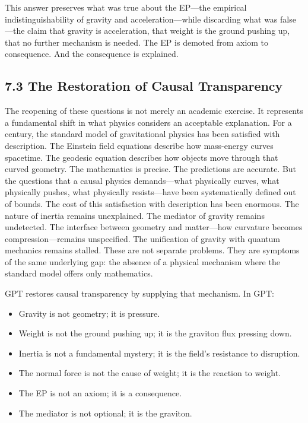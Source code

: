 \documentclass[11pt]{article}
\begin{document}
This answer preserves what was true about the EP---the empirical indistinguishability of gravity and acceleration---while discarding what was false---the claim that gravity is acceleration, that weight is the ground pushing up, that no further mechanism is needed. The EP is demoted from axiom to consequence. And the consequence is explained.

\subsection{7.3 The Restoration of Causal Transparency}

The reopening of these questions is not merely an academic exercise. It represents a fundamental shift in what physics considers an acceptable explanation. For a century, the standard model of gravitational physics has been satisfied with description. The Einstein field equations describe how mass-energy curves spacetime. The geodesic equation describes how objects move through that curved geometry. The mathematics is precise. The predictions are accurate. But the questions that a causal physics demands---what physically curves, what physically pushes, what physically resists---have been systematically defined out of bounds. The cost of this satisfaction with description has been enormous. The nature of inertia remains unexplained. The mediator of gravity remains undetected. The interface between geometry and matter---how curvature becomes compression---remains unspecified. The unification of gravity with quantum mechanics remains stalled. These are not separate problems. They are symptoms of the same underlying gap: the absence of a physical mechanism where the standard model offers only mathematics.

GPT restores causal transparency by supplying that mechanism. In GPT:

\begin{itemize}
\item
  Gravity is not geometry; it is pressure.
\item
  Weight is not the ground pushing up; it is the graviton flux pressing down.
\item
  Inertia is not a fundamental mystery; it is the field's resistance to disruption.
\item
  The normal force is not the cause of weight; it is the reaction to weight.
\item
  The EP is not an axiom; it is a consequence.
\item
  The mediator is not optional; it is the graviton.
\end{itemize}
\end{document}
